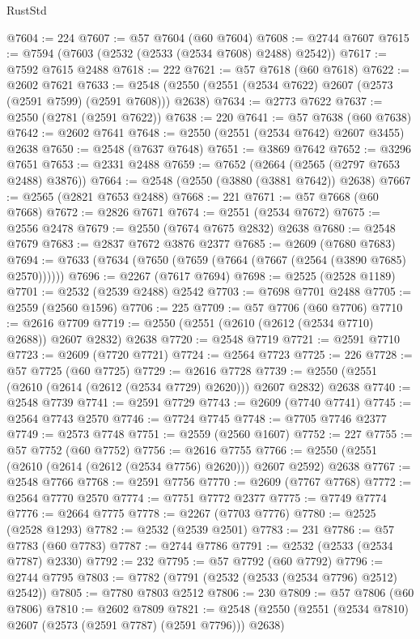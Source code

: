 \begin{lexlean}{RustStd}
\begin{coremodule}
@7604 := 224
@7607 := @57 @7604 (@60 @7604)
@7608 := @2744 @7607
@7615 := @7594 (@7603 (@2532 (@2533 (@2534 @7608) @2488) @2542))
@7617 := @7592 @7615 @2488
@7618 := 222
@7621 := @57 @7618 (@60 @7618)
@7622 := @2602 @7621
@7633 := @2548 (@2550 (@2551 (@2534 @7622) @2607 (@2573 (@2591 @7599) (@2591 @7608))) @2638)
@7634 := @2773 @7622
@7637 := @2550 (@2781 (@2591 @7622))
@7638 := 220
@7641 := @57 @7638 (@60 @7638)
@7642 := @2602 @7641
@7648 := @2550 (@2551 (@2534 @7642) @2607 @3455) @2638
@7650 := @2548 (@7637 @7648)
@7651 := @3869 @7642
@7652 := @3296 @7651
@7653 := @2331 @2488
@7659 := @7652 (@2664 (@2565 (@2797 @7653 @2488) @3876))
@7664 := @2548 (@2550 (@3880 (@3881 @7642)) @2638)
@7667 := @2565 (@2821 @7653 @2488)
@7668 := 221
@7671 := @57 @7668 (@60 @7668)
@7672 := @2826 @7671
@7674 := @2551 (@2534 @7672)
@7675 := @2556 @2478
@7679 := @2550 (@7674 @7675 @2832) @2638
@7680 := @2548 @7679
@7683 := @2837 @7672 @3876 @2377
@7685 := @2609 (@7680 @7683)
@7694 := @7633 (@7634 (@7650 (@7659 (@7664 (@7667 (@2564 (@3890 @7685) @2570))))))
@7696 := @2267 (@7617 @7694)
@7698 := @2525 (@2528 @1189)
@7701 := @2532 (@2539 @2488) @2542
@7703 := @7698 @7701 @2488
@7705 := @2559 (@2560 @1596)
@7706 := 225
@7709 := @57 @7706 (@60 @7706)
@7710 := @2616 @7709
@7719 := @2550 (@2551 (@2610 (@2612 (@2534 @7710) @2688)) @2607 @2832) @2638
@7720 := @2548 @7719
@7721 := @2591 @7710
@7723 := @2609 (@7720 @7721)
@7724 := @2564 @7723
@7725 := 226
@7728 := @57 @7725 (@60 @7725)
@7729 := @2616 @7728
@7739 := @2550 (@2551 (@2610 (@2614 (@2612 (@2534 @7729) @2620))) @2607 @2832) @2638
@7740 := @2548 @7739
@7741 := @2591 @7729
@7743 := @2609 (@7740 @7741)
@7745 := @2564 @7743 @2570
@7746 := @7724 @7745
@7748 := @7705 @7746 @2377
@7749 := @2573 @7748
@7751 := @2559 (@2560 @1607)
@7752 := 227
@7755 := @57 @7752 (@60 @7752)
@7756 := @2616 @7755
@7766 := @2550 (@2551 (@2610 (@2614 (@2612 (@2534 @7756) @2620))) @2607 @2592) @2638
@7767 := @2548 @7766
@7768 := @2591 @7756
@7770 := @2609 (@7767 @7768)
@7772 := @2564 @7770 @2570
@7774 := @7751 @7772 @2377
@7775 := @7749 @7774
@7776 := @2664 @7775
@7778 := @2267 (@7703 @7776)
@7780 := @2525 (@2528 @1293)
@7782 := @2532 (@2539 @2501)
@7783 := 231
@7786 := @57 @7783 (@60 @7783)
@7787 := @2744 @7786
@7791 := @2532 (@2533 (@2534 @7787) @2330)
@7792 := 232
@7795 := @57 @7792 (@60 @7792)
@7796 := @2744 @7795
@7803 := @7782 (@7791 (@2532 (@2533 (@2534 @7796) @2512) @2542))
@7805 := @7780 @7803 @2512
@7806 := 230
@7809 := @57 @7806 (@60 @7806)
@7810 := @2602 @7809
@7821 := @2548 (@2550 (@2551 (@2534 @7810) @2607 (@2573 (@2591 @7787) (@2591 @7796))) @2638)

\end{coremodule}
\end{lexlean}
